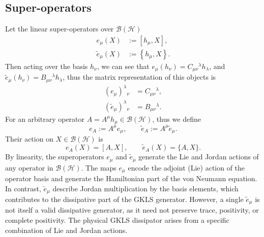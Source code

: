 \documentclass[notitlepage,aip,reprint,onecolumn]{revtex4-1}
\theoremstyle{definition}
\newcommand{\HH}{\mathcal H}
\newcommand{\BH}{\mathcal B(\HH)}
\renewcommand{\comm}[2]{\left[#1,#2\right]}
\newcommand{\acom}[2]{\left\{#1,#2\right\}}
\begin{document}
\subsection{Super-operators}\label{SubSec:Super-operators}
Let the linear super-operators over $\BH$ 
\begin{align}
     e_\mu(X)&:=\comm{h_\mu}{X},
     \label{eq:e-definition}
     \\
     \widetilde e_\mu(X)&:=\acom{h_\mu}{X}.
 \label{eq:etilde-definition}
\end{align}
Then acting over the basis \(h_\nu\), we can see that \( e_\mu(h_\nu)=C_{\mu\nu}{}^\lambda h_\lambda\), and \(\widetilde e_\mu(h_\nu)=B_{\mu\nu}{}^\lambda h_\lambda\), thus the matrix representation of this objects is
\begin{align}
     (e_\mu)^\lambda{}_{\nu}&=C_{\mu\nu}{}^\lambda,
     \\
     (\widetilde e_\mu)^\lambda{}_{\nu}&=B_{\mu\nu}{}^\lambda.
\end{align}
%
For an arbitrary operator \(A=A^\mu h_\mu\in\mathcal B(\mathcal H)\), thus we define
\begin{equation}\label{eq:eA-etildeA-definition}
    e_A
    :=
    A^\mu e_\mu,
    \qquad
    \widetilde e_A
    :=
    A^\mu\widetilde e_\mu.
\end{equation}
Their action on \(X\in\mathcal B(\mathcal H)\) is
\begin{equation}\label{eq:eA-etildeA-action}
    e_A(X)
    =
    [A,X],
    \qquad
    \widetilde e_A(X)
    =
    \{A,X\}.
\end{equation}
By linearity, the superoperators \(e_\mu\) and \(\widetilde e_\mu\) generate the Lie and Jordan actions of any operator in \(\mathcal B(\mathcal H)\). The maps \(e_\mu\) encode the adjoint (Lie) action of the operator basis and generate the Hamiltonian part of the von Neumann equation. In contrast, \(\widetilde e_\mu\) describe Jordan multiplication by the basis elements, which contributes to the dissipative part of the GKLS generator. However, a single \(\widetilde e_\mu\) is not itself a valid dissipative generator, as it need not preserve trace, positivity, or complete positivity. The physical GKLS dissipator arises from a specific combination of Lie and Jordan actions.
\end{document}
